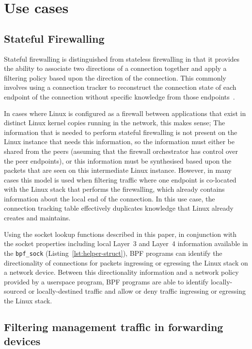 \documentclass[10pt,sigconf,authorversion]{lpc}
\newcommand\todo[1]{\textcolor{red}{#1}}
\begin{document}

\section{Use cases}

\subsection{Stateful Firewalling}

Stateful firewalling is distinguished from stateless firewalling in that it
provides the ability to associate two directions of a connection together and
apply a filtering policy based upon the direction of the connection. This
commonly involves using a connection tracker to reconstruct the connection
state of each endpoint of the connection without specific knowledge from those
endpoints~\cite{conntrack,ovs-ct}.

In cases where Linux is configured as a firewall between applications that
exist in distinct Linux kernel copies running in the network, this makes sense;
The information that is needed to perform stateful firewalling is not present
on the Linux instance that needs this information, so the information must
either be shared from the peers (assuming that the firewall orchestrator has
control over the peer endpoints), or this information must be synthesised based
upon the packets that are seen on this intermediate Linux instance. However, in
many cases this model is used when filtering traffic where one endpoint is
co-located with the Linux stack that performs the firewalling, which already
contains information about the local end of the connection. In this use case,
the connection tracking table effectively duplicates knowledge that Linux
already creates and maintains.

Using the socket lookup functions described in this paper, in conjunction with
the socket properties including local Layer~3 and Layer~4 information available
in the \verb+bpf_sock+ (Listing~\ref{lst:helper-struct}), BPF programs can
identify the directionality of connections for packets ingressing or egressing
the Linux stack on a network device. Between this directionality information
and a network policy provided by a userspace program, BPF programs are able to
identify locally-sourced or locally-destined traffic and allow or deny traffic
ingressing or egressing the Linux stack.

\subsection{Filtering management traffic in forwarding devices}
\end{document}
